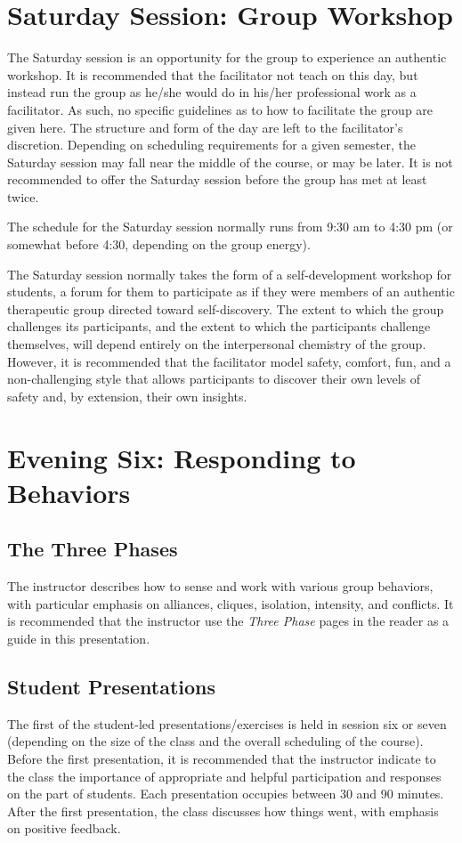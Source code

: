 \documentclass[12pt,DIV7,oneside,tocindent,headsepline]{scrbook}
\begin{document}
\section{Saturday Session: Group Workshop}  
The Saturday session is an opportunity for the group to experience an authentic workshop. It is recommended that the facilitator not teach on this day, but instead run the group as he/she would do in his/her professional work as a facilitator. As such, no specific guidelines as to how to facilitate the group are given here. The structure and form of the day are left to the facilitator's discretion.  Depending on scheduling requirements for a given semester, the Saturday session may fall near the middle of the course, or may be later. It is not recommended to offer the Saturday session before the group has met at least twice.

The schedule for the Saturday session normally runs from 9:30 am to 4:30 pm (or somewhat before 4:30, depending on the group energy).

The Saturday session normally takes the form of a self-development workshop for students, a forum for them to participate as if they were members of an authentic therapeutic group directed toward self-discovery. The extent to which the group challenges its participants, and the extent to which the participants challenge themselves, will depend entirely on the interpersonal chemistry of the group. However, it is recommended that the facilitator model safety, comfort, fun, and a non-challenging style that allows participants to discover their own levels of safety and, by extension, their own insights.

\section{Evening Six: Responding to Behaviors}  

\subsection{The Three Phases}
The instructor describes how to sense and work with various group behaviors, with particular emphasis on alliances, cliques, isolation, intensity, and conflicts. It is recommended that the instructor use the \textit{Three Phase} pages in the reader as a guide in this presentation.  

\subsection{Student Presentations}  
The first of the student-led presentations/exercises is held in session six or seven (depending on the size of the class and the overall scheduling of the course).  Before the first presentation, it is recommended that the instructor indicate to the class the importance of appropriate and helpful participation and responses on the part of students.  Each presentation occupies between 30 and 90 minutes.  After the first presentation, the class discusses how things went, with emphasis on positive feedback.
\end{document}
